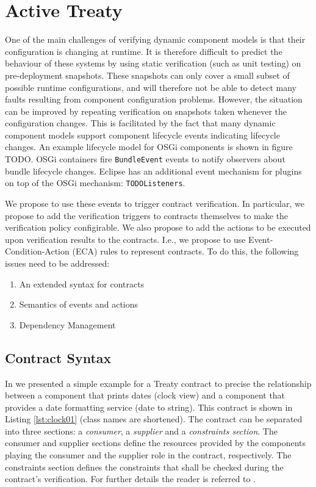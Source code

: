 \documentclass{llncs}
\begin{document}
\section{Active Treaty}
\label{section:activeTreaty}

One of the main challenges of verifying dynamic component models is that their configuration is changing at runtime. It is therefore difficult to predict the behaviour of these systems by using static verification (such as unit testing) on pre-deployment snapshots. These snapshots can only cover a small subset of possible runtime configurations, and will therefore not be able to detect many faults resulting from component configuration problems. However, the situation can 
be improved by repeating verification on snapshots taken whenever the configuration changes. This is facilitated by the fact that many dynamic component models support component lifecycle  events indicating lifecycle changes. 
An example lifecycle model for OSGi components is shown in figure TODO. OSGi containers fire \texttt{BundleEvent} events to notify observers about bundle lifecycle changes. Eclipse has an additional event mechanism for plugins on top of the OSGi mechanism: \texttt{TODOListeners}.  

We propose to use these events to trigger contract verification. In particular, we propose to add the verification triggers to contracts themselves to make the verification policy configirable. We also propose to add the actions to be executed 
upon verification results to the contracts. I.e., we propose to use Event-Condition-Action (ECA) rules to represent contracts. To do this, the following issues need to be addressed:

\begin{enumerate}
  \item An extended syntax for contracts
  \item Semantics of events and actions
  \item Dependency Management
\end{enumerate}


\subsection{Contract Syntax}

In \cite{Treaty.JOT2009} we presented a simple example for a Treaty contract to precise the relationship between a component that prints
dates (clock view) and a component that provides a date formatting service (date to string). This contract is shown in Listing \ref{lst:clock01} (class names are shortened). The contract can be separated into three sections: a \textit{consumer}, a \textit{supplier} and a \textit{constraints section}. The consumer and supplier sections define the resources provided by the components playing the consumer and the supplier role in the contract, respectively. The constraints section defines the constraints that shall be checked during the contract's verification. For further details the reader is referred to \cite{Treaty.JOT2009}.
\end{document}
